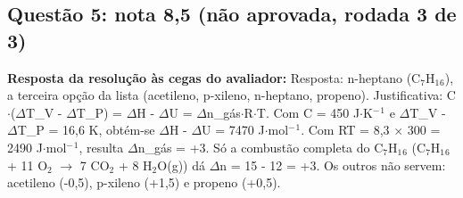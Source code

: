 \documentclass{article}%
\begin{document}
\subsection*{Questão 5: nota 8,5 (não aprovada, rodada 3 de 3)}%
\textbf{Resposta da resolução às cegas do avaliador:} Resposta: n{-}heptano (C$_{7}$H$_{1}$$_{6}$), a terceira opção da lista (acetileno, p{-}xileno, n{-}heptano, propeno).\newline%
\newline%
Justificativa: C$\cdot$($\Delta$T\_V - $\Delta$T\_P) = $\Delta$H - $\Delta$U = $\Delta$n\_gás$\cdot$R$\cdot$T. Com C = 450 J$\cdot$K$^{-}$$^{1}$ e $\Delta$T\_V - $\Delta$T\_P = 16,6 K, obtém{-}se $\Delta$H - $\Delta$U = 7470 J$\cdot$mol$^{-}$$^{1}$. Com RT = 8,3 $\times$ 300 = 2490 J$\cdot$mol$^{-}$$^{1}$, resulta $\Delta$n\_gás = +3. Só a combustão completa do C$_{7}$H$_{1}$$_{6}$ (C$_{7}$H$_{1}$$_{6}$ + 11 O$_{2}$ $\to$ 7 CO$_{2}$ + 8 H$_{2}$O(g)) dá $\Delta$n = 15 - 12 = +3. Os outros não servem: acetileno (-0,5), p{-}xileno (+1,5) e propeno (+0,5).\par %
\end{document}
